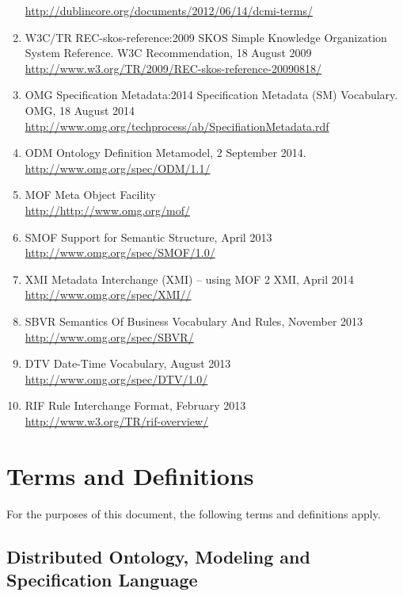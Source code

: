 \documentclass[10pt,fleqn,final]{scrreprt}
\newcommand{\clause}[1]{\chapter{#1}}
\newcommand{\sclause}[1]{\section{#1}}
\begin{document}
\begin{enumerate}[label=\bfseries NR\arabic*:]
{     \url{http://dublincore.org/documents/2012/06/14/dcmi-terms/}}
  \item{W3C/TR REC-skos-reference:2009} {SKOS Simple Knowledge Organization System
Reference.  W3C Recommendation, 18 August 2009\\ \url{http://www.w3.org/TR/2009/REC-skos-reference-20090818/}}
  \item{OMG Specification Metadata:2014} {Specification Metadata (SM) Vocabulary.  OMG, 18 August 2014\\
\url{http://www.omg.org/techprocess/ab/SpecifiationMetadata.rdf}}



  \item{ODM} {Ontology Definition Metamodel, 2 September 2014. \\ \url{http://www.omg.org/spec/ODM/1.1/}}
\item{MOF} { Meta Object Facility} \\ \url{http://http://www.omg.org/mof/}
\item{SMOF} { Support for Semantic Structure, April 2013} \\ \url{http://www.omg.org/spec/SMOF/1.0/}
\item{XMI} {Metadata Interchange (XMI) – using MOF 2 XMI, April 2014} \\ \url{http://www.omg.org/spec/XMI//}
\item{SBVR} {Semantics Of Business Vocabulary And Rules, November 2013} \\ \url{http://www.omg.org/spec/SBVR/}
\item{DTV} {Date-Time Vocabulary, August 2013} \\ \url{http://www.omg.org/spec/DTV/1.0/}
\item{RIF} {Rule Interchange Format, February 2013} \\ \url{http://www.w3.org/TR/rif-overview/}
\end{enumerate}




\clause{Terms and Definitions}\label{terms-and-defs}

For the purposes of this document, the following terms and definitions apply.

\sclause{Distributed Ontology, Modeling and Specification Language}
\end{document}
